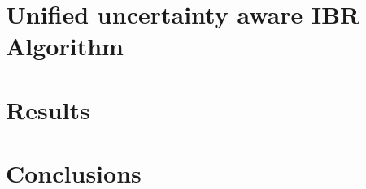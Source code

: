 \documentclass[review]{acmsiggraph}
\begin{document}
\section{Unified uncertainty aware IBR Algorithm}


\section{Results}


\section{Conclusions}








\end{document}
